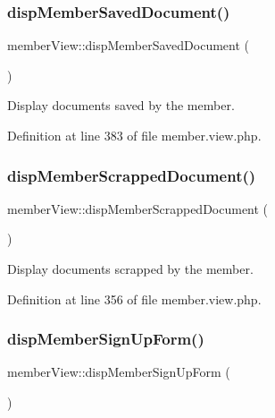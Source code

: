 \subsubsection{\texorpdfstring{disp\+Member\+Saved\+Document()}{dispMemberSavedDocument()}}
{\footnotesize\ttfamily member\+View\+::disp\+Member\+Saved\+Document (\begin{DoxyParamCaption}{ }\end{DoxyParamCaption})}



Display documents saved by the member. 



Definition at line 383 of file member.\+view.\+php.

\mbox{\label{classmemberView_a3f2cb0686636f31174aeba8e2e048816}} 
\subsubsection{\texorpdfstring{disp\+Member\+Scrapped\+Document()}{dispMemberScrappedDocument()}}
{\footnotesize\ttfamily member\+View\+::disp\+Member\+Scrapped\+Document (\begin{DoxyParamCaption}{ }\end{DoxyParamCaption})}



Display documents scrapped by the member. 



Definition at line 356 of file member.\+view.\+php.

\mbox{\label{classmemberView_a1ebd31e392f344898940c0dc739fa6cb}} 
\subsubsection{\texorpdfstring{disp\+Member\+Sign\+Up\+Form()}{dispMemberSignUpForm()}}
{\footnotesize\ttfamily member\+View\+::disp\+Member\+Sign\+Up\+Form (\begin{DoxyParamCaption}{ }\end{DoxyParamCaption})}



